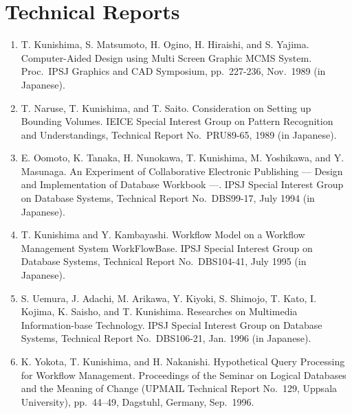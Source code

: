 \section*{Technical Reports}
\begin{enumerate}
 \item T. Kunishima, S. Matsumoto, H. Ogino, H. Hiraishi, and
       S. Yajima.
       Computer-Aided Design using Multi Screen Graphic
       {MCMS} System.
       Proc.\ IPSJ Graphics and CAD Symposium, pp.\ 227-236,
       Nov.\ 1989 (in Japanese).
 \item T. Naruse, T. Kunishima, and T. Saito.
       Consideration on Setting up Bounding Volumes.
       IEICE Special Interest Group on Pattern Recognition and
       Understandings, Technical Report No.\ PRU89-65,
       1989 (in Japanese).
 \item E. Oomoto, K. Tanaka, H. Nunokawa, T. Kunishima, M. Yoshikawa,
       and Y. Masunaga.
       An Experiment of Collaborative Electronic Publishing --- Design
       and Implementation of Database Workbook ---.
       IPSJ Special Interest Group on Database Systems, Technical Report 
       No.\ DBS99-17,
       July 1994 (in Japanese).
 \item T. Kunishima and Y. Kambayashi.
       Workflow Model on a Workflow Management System WorkFlowBase.
       IPSJ Special Interest Group on Database Systems, Technical Report 
       No.\ DBS104-41,
       July 1995 (in Japanese).
 \item S. Uemura, J. Adachi, M. Arikawa, Y. Kiyoki, S. Shimojo, T. Kato, 
       I. Kojima, K. Saisho, and T. Kunishima.
       Researches on Multimedia Information-base Technology.
       IPSJ Special Interest Group on Database Systems, Technical Report 
       No.\ DBS106-21,
       Jan. 1996 (in Japanese).
 \item K. Yokota, T. Kunishima, and H. Nakanishi.
       Hypothetical Query Processing for Workflow Management.
       Proceedings of the Seminar on Logical Databases and the Meaning
       of Change (UPMAIL Technical Report No.\ 129, Uppsala University),
       pp.\ 44--49, Dagstuhl, Germany, Sep.\ 1996.
\end{enumerate}

